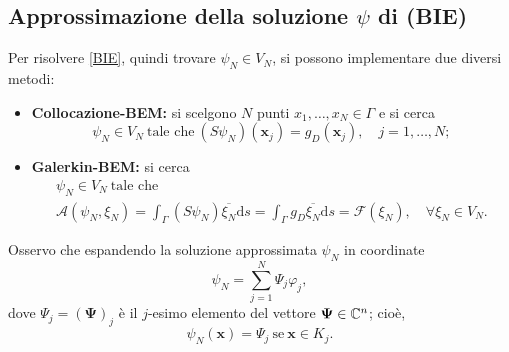 \subsection{Approssimazione della soluzione $\psi$ di (BIE)}
Per risolvere \eqref{BIE}, quindi trovare $\psi_N \in V_N$, si possono implementare due diversi metodi:
\begin{itemize}
	\item \textbf{Collocazione-BEM:} si scelgono $N$ punti $x_1,\dots,x_N \in \Gamma$ e si cerca
	\begin{equation}
		\psi_N\in V_N \ \text{tale che} \ (S\psi_N)(\textbf{x}_j) = g_D(\textbf{x}_j), \quad j= 1,\dots,N;
	\end{equation}
	\item \textbf{Galerkin-BEM:} si cerca
	\begin{multline} \label{Galerkin}
		\psi_N \in V_N \ \text{tale che} \\ \mathcal{A}(\psi_N,\xi_N) = \int_\Gamma (S\psi_N)\overline{\xi_N} \mathrm{d}s = \int_\Gamma g_D\overline{\xi_N} \mathrm{d}s = \mathcal{F}(\xi_N), \quad \forall \xi_N \in V_N.
	\end{multline}
\end{itemize}
Osservo che espandendo la soluzione approssimata $\psi_N$ in coordinate
\[ \psi_N= \sum_{j=1}^N \Psi_j \varphi_j, \]
dove $\Psi_j = (\pmb{\Psi})_j$ è il $j$-esimo elemento del vettore $\bm{\Psi} \in \mathbb{C}^n$; cioè, 
\[ \psi_N(\textbf{x}) = \Psi_j \ \text{se} \ \textbf{x} \in K_j. \]



